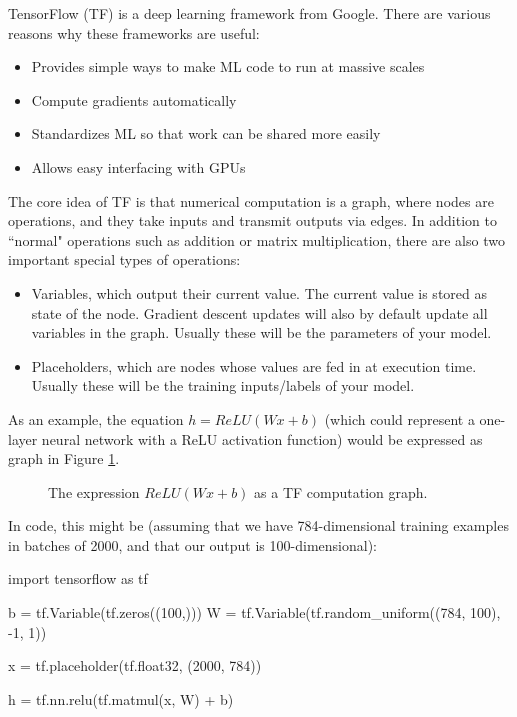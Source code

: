TensorFlow (TF) is a deep learning framework from Google. There are various reasons why these frameworks are useful:
\begin{itemize}
\item Provides simple ways to make ML code to run at massive scales
\item Compute gradients automatically
\item Standardizes ML so that work can be shared more easily
\item Allows easy interfacing with GPUs
\end{itemize}
The core idea of TF is that numerical computation is a graph, where nodes are operations, and they take inputs and transmit outputs via edges. In addition to ``normal" operations such as addition or matrix multiplication, there are also two important special types of operations:
\begin{itemize}
\item Variables, which output their current value. The current value is stored as state of the node. Gradient descent updates will also by default update all variables in the graph. Usually these will be the parameters of your model.
\item Placeholders, which are nodes whose values are fed in at execution time. Usually these will be the training inputs/labels of your model.
\end{itemize}
As an example, the equation $h = ReLU(Wx + b)$ (which could represent a one-layer neural network with a ReLU activation function) would be expressed as graph in Figure \ref{fig7-1}.
\begin{figure}
\centering
{}
\caption{The expression $ReLU(Wx + b)$ as a TF computation graph.} \label{fig7-1}
\end{figure}
In code, this might be (assuming that we have 784-dimensional training examples in batches of 2000, and that our output is 100-dimensional):
\begin{python}
import tensorflow as tf

b = tf.Variable(tf.zeros((100,)))
W = tf.Variable(tf.random_uniform((784, 100), -1, 1))

x = tf.placeholder(tf.float32, (2000, 784))

h = tf.nn.relu(tf.matmul(x, W) + b)
\end{python}


